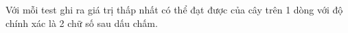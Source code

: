 Với mỗi test ghi ra giá trị thấp nhất có thể đạt được của cây trên 1 dòng với độ chính xác là 2 chữ số sau dấu chấm.